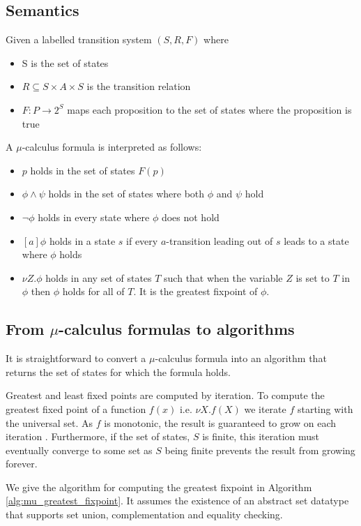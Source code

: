 \subsection{Semantics}

Given a labelled transition system $(S, R, F)$ where
\begin{itemize}
    \item S is the set of states
    \item $R \subseteq S \times A \times S$ is the transition relation
    \item $F : P \rightarrow 2^S$ maps each proposition to the set of states where the proposition is true
\end{itemize}

\noindent A $\mu$-calculus formula is interpreted as follows:
\begin{itemize}
    \item $p$ holds in the set of states $F(p)$
    \item $\phi \wedge \psi$ holds in the set of states where both $\phi$ and $\psi$ hold
    \item $\neg \phi$ holds in every state where $\phi$ does not hold 
    \item $[a]\phi$ holds in a state $s$ if every $a$-transition leading out of $s$ leads to a state where $\phi$ holds
    \item $\nu Z. \phi$ holds in any set of states $T$ such that when the variable $Z$ is set to $T$ in $\phi$ then $\phi$ holds for all of $T$. It is the greatest fixpoint of $\phi$.
\end{itemize}

\subsection{From $\mu$-calculus formulas to algorithms}

It is straightforward to convert a $\mu$-calculus formula into an algorithm that returns the set of states for which the formula holds.

Greatest and least fixed points are computed by iteration. To compute the greatest fixed point of a function $f(x)$ i.e. $\nu X. f(X)$ we iterate $f$ starting with the universal set. As $f$ is monotonic, the result is guaranteed to grow on each iteration . Furthermore, if the set of states, $S$ is finite, this iteration must eventually converge to some set as $S$ being finite prevents the result from growing forever. 

We give the algorithm for computing the greatest fixpoint in Algorithm \ref{alg:mu_greatest_fixpoint}. It assumes the existence of an abstract set datatype that supports set union, complementation and equality checking.

